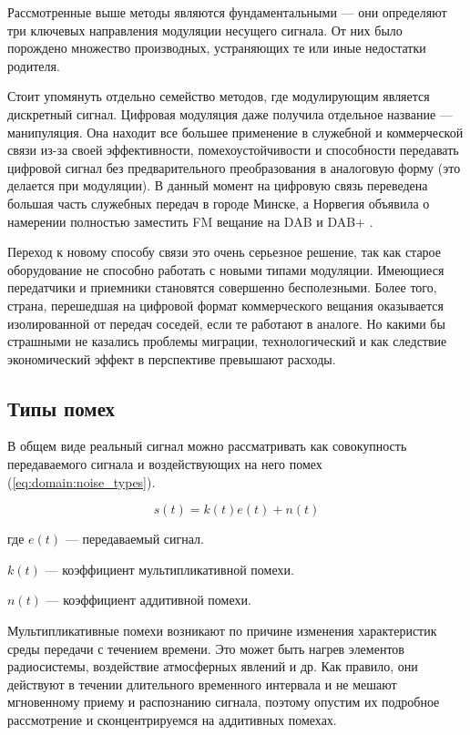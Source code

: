 Рассмотренные выше методы являются фундаментальными --- они определяют три ключевых направления модуляции несущего сигнала. От них было порождено множество производных, устраняющих те или иные недостатки родителя.

Стоит упомянуть отдельно семейство методов, где модулирующим является дискретный сигнал. Цифровая модуляция даже получила отдельное название --- манипуляция. Она находит все большее применение в служебной и коммерческой связи из-за своей эффективности, помехоустойчивости и способности передавать цифровой сигнал без предварительного преобразования в аналоговую форму (это делается при модуляции). В данный момент на цифровую связь переведена большая часть служебных передач в городе Минске, а Норвегия объявила о намерении полностью заместить FM вещание на DAB и DAB+ \cite{norway_dab}.

Переход к новому способу связи это очень серьезное решение, так как старое оборудование не способно работать с новыми типами модуляции. Имеющиеся передатчики и приемники становятся совершенно бесполезными. Более того, страна, перешедшая на цифровой формат коммерческого вещания оказывается изолированной от передач соседей, если те работают в аналоге. Но какими бы страшными не казались проблемы миграции, технологический и как следствие экономический эффект в перспективе превышают расходы.

\subsection{Типы помех}

В общем виде реальный сигнал можно рассматривать как совокупность передаваемого сигнала и воздействующих на него помех (\autoref{eq:domain:noise_types}).

\begin{equation}
  \label{eq:domain:noise_types}
  s(t) = k(t) e(t) + n(t)
\end{equation}
\begin{explanation}
\item[где] $e(t)$ --- передаваемый сигнал.
\item $k(t)$ --- коэффициент мультипликативной помехи.
\item $n(t)$ --- коэффициент аддитивной помехи.
\end{explanation}

Мультипликативные помехи возникают по причине изменения характеристик среды передачи с течением времени. Это может быть нагрев элементов радиосистемы, воздействие атмосферных явлений и др. Как правило, они действуют в течении длительного временного интервала и не мешают мгновенному приему и распознанию сигнала, поэтому опустим их подробное рассмотрение и сконцентрируемся на аддитивных помехах.

